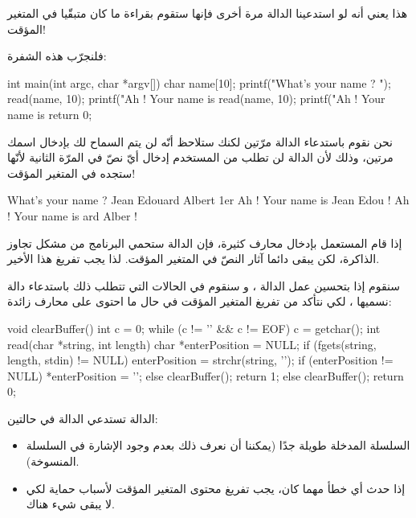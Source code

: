 هذا يعني أنه لو استدعينا الدالة
مرة أخرى فإنها ستقوم بقراءة ما كان متبقّيا في المتغير المؤقت!

فلنجرّب هذه الشفرة:

\begin{Csource}
int main(int argc, char *argv[])
{
 	char name[10];
 	printf("What's your name ? ");
 	read(name, 10);
 	printf("Ah ! Your name is %
 	read(name, 10);
 	printf("Ah ! Your name is %
 	return 0;
}
\end{Csource}

نحن نقوم باستدعاء الدالة
مرّتين لكنك ستلاحظ أنّه لن يتم السماح لك بإدخال اسمك مرتين، وذلك لأن الدالة
لن تطلب من المستخدم إدخال أيّ نصّ في المرّة الثانية لأنّها ستجده في المتغير المؤقت!

\begin{Console}
  What's your name ? Jean Edouard Albert 1er
  Ah ! Your name is Jean Edou !
  Ah ! Your name is ard Alber !
\end{Console}

إذا قام المستعمل بإدخال محارف كثيرة، فإن الدالة
ستحمي البرنامج من مشكل تجاوز الذاكرة، لكن يبقى دائما آثار النصّ في المتغير المؤقت. لذا يجب تفريغ هذا الأخير.

سنقوم إذا بتحسين عمل الدالة
،
و سنقوم في الحالات التي تتطلب ذلك باستدعاء دالة نسميها
،
لكي نتأكد من تفريغ المتغير المؤقت في حال ما احتوى على محارف زائدة:

\begin{Csource}
void clearBuffer()
{
 	int c = 0;
 	while (c != '\n' && c != EOF)
 	{
     		c = getchar();
 	}
}
int read(char *string, int length)
{
 	char *enterPosition = NULL;
 	if (fgets(string, length, stdin) != NULL)
 	{
     		enterPosition = strchr(string, '\n');
     		if (enterPosition != NULL)
     		{
         			*enterPosition = '\0';
     		}
     		else
     		{
         			clearBuffer();
     		}
     		return 1;
 	}
 	else
 	{
     		clearBuffer();
     		return 0;
	}
}
\end{Csource}

الدالة
تستدعي الدالة
في حالتين:

\begin{itemize}
  \item السلسلة المدخلة طويلة جدًا (يمكننا أن نعرف ذلك بعدم وجود الإشارة
في السلسلة المنسوخة).
  \item إذا حدث أي خطأ مهما كان، يجب تفريغ محتوى المتغير المؤقت لأسباب حماية لكي لا يبقى شيء هناك.
\end{itemize}

